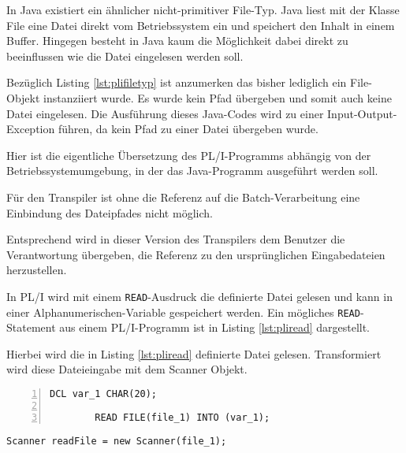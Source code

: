 In Java existiert ein ähnlicher nicht-primitiver File-Typ.
Java liest mit der Klasse File eine Datei direkt vom Betriebssystem ein und speichert den Inhalt in einem Buffer. 
Hingegen besteht in Java kaum die Möglichkeit dabei direkt zu beeinflussen wie die Datei eingelesen werden soll. 


Bezüglich Listing \ref{lst:plifiletyp} ist anzumerken das bisher lediglich ein File-Objekt instanziiert wurde.
Es wurde kein Pfad übergeben und somit auch keine Datei eingelesen. 
Die Ausführung dieses Java-Codes wird zu einer Input-Output-Exception führen, da kein Pfad zu einer Datei übergeben wurde.

Hier ist die eigentliche Übersetzung des PL/I-Programms abhängig von der Betriebssystemumgebung, in der das Java-Programm ausgeführt werden soll.

Für den Transpiler ist ohne die Referenz auf die Batch-Verarbeitung eine Einbindung des Dateipfades nicht möglich.

Entsprechend wird in dieser Version des Transpilers dem Benutzer die Verantwortung übergeben, die Referenz zu den ursprünglichen Eingabedateien herzustellen.

In PL/I wird mit einem \verb+READ+-Ausdruck die definierte Datei gelesen und kann in einer Alphanumerischen-Variable gespeichert werden.
Ein mögliches \verb+READ+-Statement aus einem PL/I-Programm ist in Listing \ref{lst:pliread} dargestellt.

Hierbei wird die in Listing \ref{lst:pliread} definierte Datei gelesen.
Transformiert wird diese Dateieingabe mit dem Scanner Objekt.

\begin{minipage}[b]{0.5\linewidth}
	\centering
	\lstset{language=PL/I,label=SliceExaple}
	\begin{lstlisting}[frame=single, numbers=left, mathescape,%
		caption={Transformation deiner If-Else-Statements}, label={lst:pliread}]
		DCL var_1 CHAR(20);
		
		READ FILE(file_1) INTO (var_1); 
	\end{lstlisting}
\end{minipage}
\hspace{0.5cm}
\begin{minipage}[b]{0.5\linewidth}
	\centering
	\lstset{language=Java,label=SliceExaple}
	\begin{lstlisting}[frame=single, mathescape,%
		title={}]
		Scanner readFile = new Scanner(file_1);
	\end{lstlisting}
\end{minipage}  



